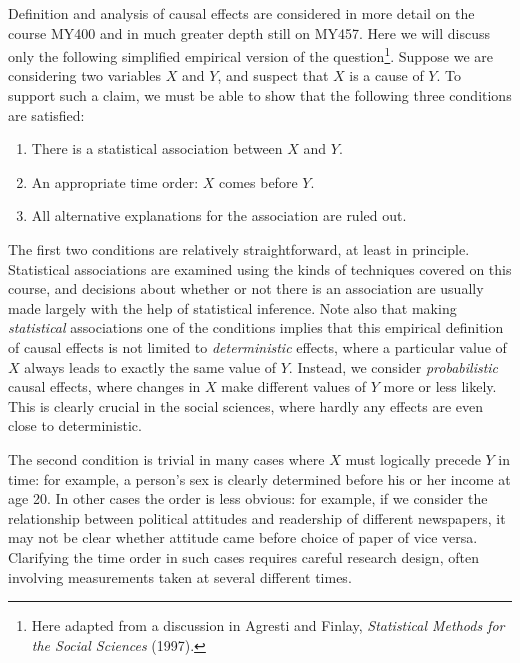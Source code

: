 Definition and analysis of causal effects are considered in more
detail on the course MY400 and in much greater depth still on MY457.
Here we will discuss only the following simplified empirical version of the question\footnote{
Here adapted from a discussion in Agresti and Finlay,
\emph{Statistical Methods for the Social Sciences} (1997).}. Suppose we are
considering two variables $X$ and $Y$, and suspect that $X$ is a cause
of $Y$. To support such a claim, we must be able to show that the
following three conditions are satisfied:
\begin{enumerate}
\item
There is a statistical association between $X$ and $Y$.
\item
An appropriate time order: $X$ comes before $Y$.
\item
All alternative explanations for the association are ruled out.
\end{enumerate}
The first two conditions are relatively straightforward, at least in
principle. Statistical associations are examined using the kinds of
techniques covered on this course, and decisions about whether or not
there is an association are usually made largely with the help of
statistical inference. Note also that making \emph{statistical}
associations one of the conditions implies that this empirical
definition of causal effects is not limited to \emph{deterministic}
effects, where a particular value of $X$ always leads to exactly the
same value of $Y$. Instead, we consider \emph{probabilistic} causal
effects, where changes in  $X$ make different values of $Y$ more or less
likely. This is clearly crucial in the social sciences, where hardly any
effects are even close to deterministic.

The second condition is trivial in many cases where $X$ must logically
precede $Y$ in time: for example, a person's sex is clearly determined
before his or her income at age 20. In other cases the order is
less obvious: for example, if we consider the relationship between
political attitudes and readership of different newspapers, it may not
be clear whether attitude came before choice of paper of vice versa.
Clarifying the time order in such cases requires careful research
design, often involving measurements taken at several different times.

